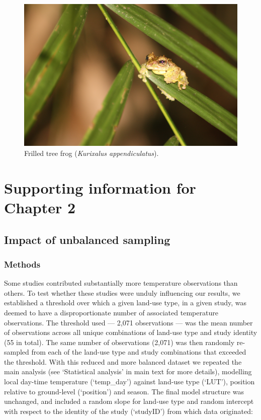 \documentclass[12pt,a4paper,]{report}
\theoremstyle{definition}
\theoremstyle{definition}
\theoremstyle{definition}
\theoremstyle{remark}
\begin{document}
\begin{figure}[!htb]
\centering
\includegraphics[width=13cm]{pics/Frilled_tree_frog.jpg}
\caption*{Frilled tree frog (\textit{Kurixalus appendiculatus}).}
\end{figure}

\clearpage
{}

\appendix


\chapter{Supporting information for Chapter
2}\label{supporting-information-for-chapter-2}

\section{Impact of unbalanced sampling}\label{text-A-1-1}

\subsection{Methods}\label{methods-1}

Some studies contributed substantially more temperature observations
than others. To test whether these studies were unduly influencing our
results, we established a threshold over which a given land-use type, in
a given study, was deemed to have a disproportionate number of
associated temperature observations. The threshold used --- 2,071
observations --- was the mean number of observations across all unique
combinations of land-use type and study identity (55 in total). The same
number of observations (2,071) was then randomly re-sampled from each of
the land-use type and study combinations that exceeded the threshold.
With this reduced and more balanced dataset we repeated the main
analysis (see `Statistical analysis' in main text for more details),
modelling local day-time temperature (`temp\_day') against land-use type
(`LUT'), position relative to ground-level (`position') and season. The
final model structure was unchanged, and included a random slope for
land-use type and random intercept with respect to the identity of the
study (`studyID') from which data originated:
\end{document}
